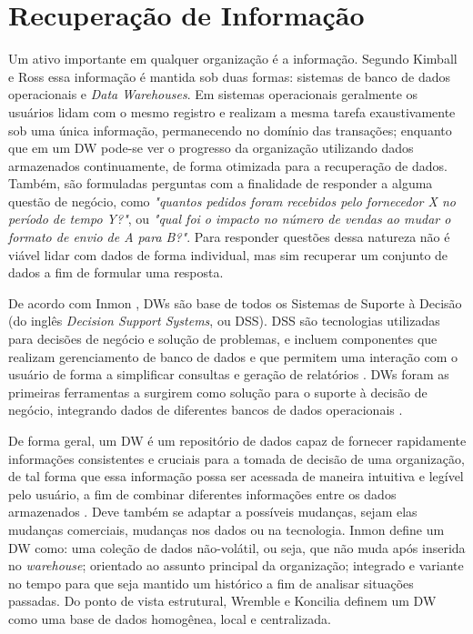 \chapter{Recuperação de Informação}
\label{cap_2}

Um ativo importante em qualquer organização é a informação. Segundo Kimball e Ross \cite{kimball2002dw} essa informação é mantida sob duas formas: sistemas de banco de dados operacionais e \textit{Data Warehouses}. Em sistemas operacionais geralmente os usuários lidam com o mesmo registro e realizam a mesma tarefa exaustivamente sob uma única informação, permanecendo no domínio das transações; enquanto que em um DW pode-se ver o progresso da organização utilizando dados armazenados continuamente, de forma otimizada para a recuperação de dados. Também, são formuladas perguntas com a finalidade de responder a alguma questão de negócio, como \textit{"quantos pedidos foram recebidos pelo fornecedor X no período de tempo Y?"}, ou \textit{"qual foi o impacto no número de vendas ao mudar o formato de envio de A para B?"}. Para responder questões dessa natureza não é viável lidar com dados de forma individual, mas sim recuperar um conjunto de dados a fim de formular uma resposta.


De acordo com Inmon \cite{inmon2005building}, DWs são base de todos os Sistemas de Suporte à Decisão (do inglês \textit{Decision Support Systems}, ou DSS). DSS são tecnologias utilizadas para decisões de negócio e solução de problemas, 
e incluem componentes que realizam gerenciamento de banco de dados e que 
permitem uma interação com o usuário de forma a simplificar consultas e geração de relatórios 
\cite{shim2002past}. DWs foram as primeiras ferramentas a surgirem como solução para o 
suporte à decisão de negócio, integrando dados de diferentes bancos de dados operacionais 
\cite{inmon2005building, kimball2002dw}.

De forma geral, um DW é um repositório de dados capaz de fornecer rapidamente 
informações consistentes e cruciais para a tomada de decisão de uma organização, 
de tal forma que essa informação possa ser acessada de maneira intuitiva e legível 
pelo usuário, a fim de combinar diferentes informações entre os dados armazenados 
\cite{kimball2002dw}. Deve também se adaptar a possíveis mudanças, sejam elas mudanças comerciais, mudanças nos dados ou na tecnologia. Inmon \cite{inmon2005building} define um DW como: uma coleção de dados não-volátil, ou seja, que não muda após inserida no \textit{warehouse}; orientado ao assunto principal da organização; integrado e variante no tempo para que seja mantido um histórico a fim de analisar situações passadas. Do ponto de vista estrutural, Wremble e Koncilia \cite{wrembel2007data} definem um DW como uma base de dados homogênea, local e centralizada.


